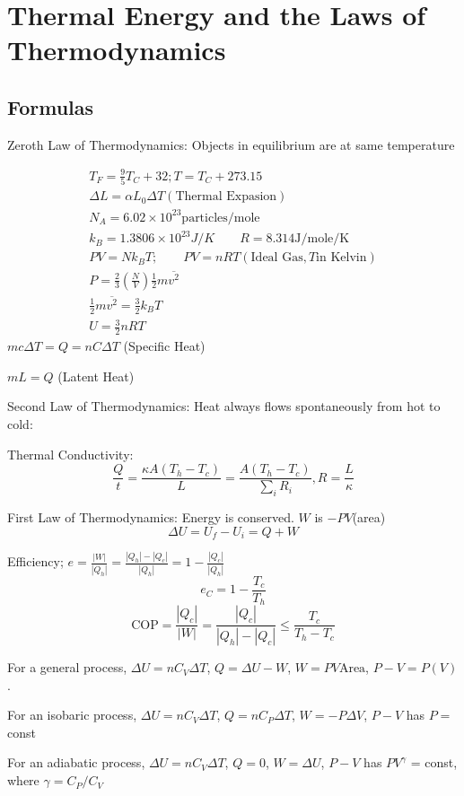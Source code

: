 \documentclass[../physics12.tex]{subfiles}
\begin{document}
\chapter{Thermal Energy and the Laws of Thermodynamics}
\section{Formulas}
Zeroth Law of Thermodynamics: Objects in equilibrium are at same temperature

\begin{align*}
    T_F = \frac{9}{5}T_C + 32; T=T_C + 273.15 \\ 
    \Delta L = \alpha L_0\Delta T (\text{Thermal Expasion})\\
    N_A = 6.02\times 10^{23} \text{particles/mole}\\
    k_B = 1.3806 \times 10^{23} J/K \qquad R = 8.314 \text{J/mole/K}\\
    PV = Nk_B T; \qquad PV = nRT (\text{Ideal Gas}, T \text{in Kelvin})\\
    P = \frac{2}{3}\left(\frac{N}{V}\right)\frac{1}{2}m\overline{v^2}\\ 
    \frac{1}{2}m\overline{v^2}=\frac{3}{2}k_B T \\
    U = \frac{3}{2}nRT 
\end{align*}
$mc\Delta T = Q = nC\Delta T$ (Specific Heat)

$mL = Q$ (Latent Heat)

Second Law of Thermodynamics: Heat always flows spontaneously from hot to cold:

Thermal Conductivity:
\[\frac{Q}{t}=\frac{\kappa A(T_h-T_c)}{L}=\frac{A(T_h-T_c)}{\sum_i R_i}, R=\frac{L}{\kappa}\]

First Law of Thermodynamics: Energy is conserved. $W$ is $-PV$(area)
\[ \Delta U = U_f-U_i = Q+W \]

Efficiency; $e=\frac{|W|}{|Q_h|}=\frac{|Q_h|-|Q_c|}{|Q_h|}=1-\frac{|Q_c|}{|Q_h|}$
\[ e_C = 1-\frac{T_c}{T_h}\]
\[ \text{COP} = \frac{|Q_c|}{|W|}=\frac{|Q_c|}{|Q_h|-|Q_c|}\leq \frac{T_c}{T_h-T_c} \]

For a general process, $\Delta U = nC_V\Delta T$, $Q = \Delta U-W$, $W = PV \text{Area}$, $P-V = P(V)$.

For an isobaric process, $\Delta U = nC_V\Delta T$, $Q = nC_P\Delta T$, $W=-P\Delta V$, $P-V$ has $P=$ const 

For an adiabatic process, $\Delta U = nC_V\Delta T$, $Q=0$, $W=\Delta U$, $P-V$ has $PV^{\gamma}$ = const, where $\gamma = C_P/C_V$
\end{document}
